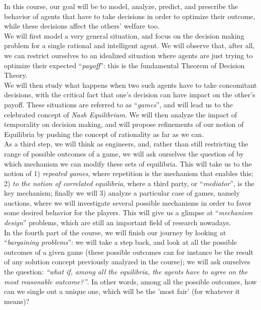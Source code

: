 In this course, our goal will be to model, analyze, predict, and prescribe the behavior of agents that have to take decisions in order to optimize their outcome, while these decisions affect the others' welfare too.  \\
We will first model a very general situation, and focus on the decision making problem for a single rational and intelligent agent. We will observe that, after all, we can restrict ourselves to an idealized situation where agents are just trying to optimize their expected ``\emph{payoff}'': this is the fundamental Theorem of Decision Theory. \\
We will then study what happens when two such agents have to take concomitant decisions, with the critical fact that one's decision can have impact on the other's payoff. These situations are referred to as ``\emph{games}'', and will lead us to the celebrated concept of \emph{Nash Equilibrium}.
We will then analyze the impact of temporality on decision making, and will propose refinements of our notion of Equilibria by pushing the concept of rationality as far as we can.  \\
As a third step, we will think as engineers, and, rather than still restricting the range of possible outcomes of a game, we will ask ourselves the question of by which mechanism we can modify these sets of equilibria.  This will take us to the notion of 1) \emph{repeated games}, where repetition is the mechanism that enables this; 2) \emph{to the notion of correlated equilibria}, where a third party, or ``\emph{mediator}'', is the key mechanism; finally we will 3) analyze a particular case of games, namely auctions, where we will investigate several possible mechanisms in order to favor some desired behavior for the players.  This will give us a glimpse at ``\emph{mechanism design}'' problems, which are still an important field of research nowadays.  \\
In the fourth part of the course, we will finish our journey by looking at ``\emph{bargaining problems}'': we will take a step back, and look at all the possible outcomes of a given game (these possible outcomes can for instance be the result of any solution concept previously analyzed in the course); we will ask ourselves the question: \emph{``what if, among all the equilibria, the agents have to agree on the most reasonable outcome?''}.  In other words, among all the possible outcomes, how can we single out a unique one, which will be the 'most fair' (for whatever it means)?

